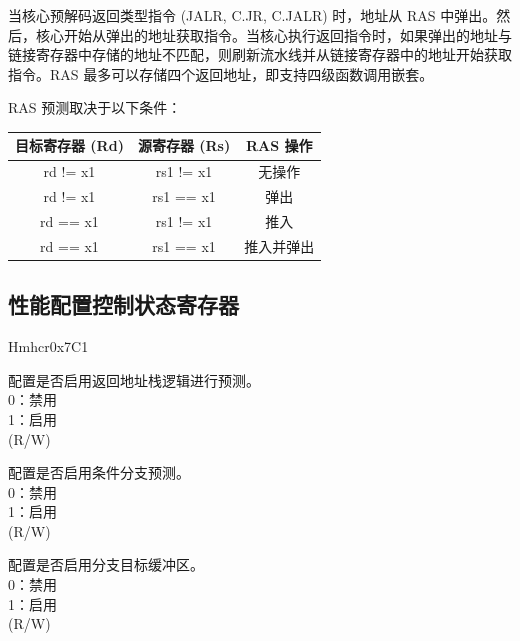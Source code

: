 \documentclass[main\_\_CN.tex]{subfiles}
\begin{document}
当核心预解码返回类型指令 (JALR, C.JR, C.JALR) 时，地址从 RAS 中弹出。然后，核心开始从弹出的地址获取指令。当核心执行返回指令时，如果弹出的地址与链接寄存器中存储的地址不匹配，则刷新流水线并从链接寄存器中的地址开始获取指令。RAS 最多可以存储四个返回地址，即支持四级函数调用嵌套。

RAS 预测取决于以下条件：

\begin{longtable}{ | c | c | c | }
\hline\rowcolor{lightgray}
目标寄存器 (Rd) & 源寄存器 (Rs) & RAS 操作 \\ \hline
\endfirsthead
\hline
rd != x1 & rs1 != x1 & 无操作 \\ \hline
rd != x1 & rs1 == x1 & 弹出 \\ \hline
rd == x1 & rs1 != x1 & 推入 \\ \hline
rd == x1 & rs1 == x1 & 推入并弹出 \\ \hline
\end{longtable}

 \subsection{性能配置控制状态寄存器}
\label{sec:riscvcpu-perf-csr}
\begin{register}{H}{mhcr}{0x7C1}\label{regdesc:MHCR}
%
%
%
%
%
%
\regnewline%
\begin{regdesc}\begin{reglist}
\label{fielddesc:MHCRRS}\item [RS] 配置是否启用返回地址栈逻辑进行预测。\\
0：禁用 \\
1：启用 \\
(R/W)
\label{fielddesc:MHCRBPE}\item [BPE] 配置是否启用条件分支预测。\\
0：禁用 \\
1：启用 \\
(R/W)
\label{fielddesc:MHCRBTB}\item [BTB]配置是否启用分支目标缓冲区。\\
0：禁用 \\
1：启用 \\
(R/W)
\end{reglist}\end{regdesc}
\end{register}
\newpage
\end{document}
